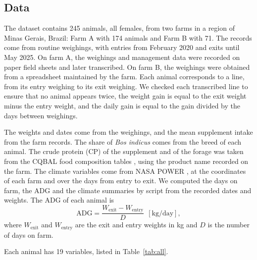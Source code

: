 \documentclass[runningheads]{llncs}
\begin{document}
\subsection{Data}

The dataset contains 245 animals, all females, from two farms in a region of Minas Gerais, Brazil: Farm A with 174 animals and Farm B with 71. The records come from routine weighings, with entries from February 2020 and exits until May 2025. On farm A, the weighings and management data were recorded on paper field sheets and later transcribed. On farm B, the weighings were obtained from a spreadsheet maintained by the farm. Each animal corresponds to a line, from its entry weighing to its exit weighing. We checked each transcribed line to ensure that no animal appears twice, the weight gain is equal to the exit weight minus the entry weight, and the daily gain is equal to the gain divided by the days between weighings.

The weights and dates come from the weighings, and the mean supplement intake from the farm records. The share of \textit{Bos indicus} comes from the breed of each animal. The crude protein (CP) of the supplement and of the forage was taken from the CQBAL food composition tables \cite{cqbal2018}, using the product name recorded on the farm. The climate variables come from NASA POWER \cite{nasapower2026}, at the coordinates of each farm and over the days from entry to exit. We computed the days on farm, the ADG and the climate summaries by script from the recorded dates and weights.
The ADG of each animal is
\begin{equation}
\mathrm{ADG} = \frac{W_{\mathrm{exit}} - W_{\mathrm{entry}}}{D}\ \ [\mathrm{kg/day}],
\end{equation}
where $W_{\mathrm{exit}}$ and $W_{\mathrm{entry}}$ are the exit and entry weights in kg and $D$ is the number of days on farm.

Each animal has 19 variables, listed in Table~\ref{tab:all}.
\end{document}
